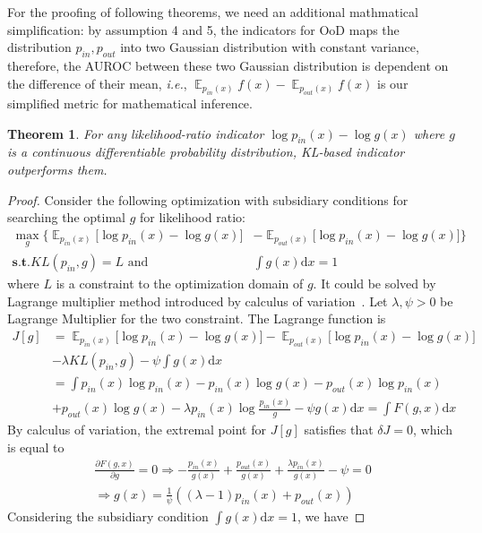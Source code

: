 \documentclass[a3paper]{article}
\newtheorem{theorem}{Theorem}
\newtheorem*{proof}{\it{Proof.}\rm}
\newcommand{\IE}{\textit{i.e.}, }
\newcommand{\dd}{\mathrm{d}}
\newcommand{\E}{\operatorname{\mathbb{E}}}
\newcommand{\pin}{p_{in}}
\newcommand{\pout}{p_{out}}
\begin{document}
For the proofing of following theorems, we need an additional mathmatical simplification: by assumption 4 and 5, the indicators for OoD maps the distribution $\pin, \pout$ into two Gaussian distribution with constant variance, therefore, the AUROC between these two Gaussian distribution is dependent on the difference of their mean, \IE $\E_{\pin(x)} f(x) - \E_{\pout(x)} f(x)$ is our simplified metric for mathematical inference. 

\begin{theorem}\label{thm4}
For any likelihood-ratio indicator $\log \pin(x) - \log g(x)$ where $g$ is a continuous differentiable probability distribution, KL-based indicator outperforms them.
\end{theorem}
\begin{proof}\rm
	Consider the following optimization with subsidiary conditions for searching the optimal $g$ for likelihood ratio:
	\begin{align*}
	\max_g \Big\{\E_{\pin(x)} \big[\log \pin(x) - \log g(x)\big] &- \E_{\pout(x)} \big[\log \pin(x) - \log g(x)\big]\Big\} \\
	\textbf{s.t.} KL(\pin, g) = L \text{ and } &\int g(x) \dd x = 1 
	\end{align*}
	where $L$ is a constraint to the optimization domain of $g$. It could be solved by Lagrange multiplier method introduced by calculus of variation~\cite{gelfand2000calculus}. 
	Let $\lambda, \psi > 0$ be Lagrange Multiplier for the two constraint. The Lagrange function is 
	\begin{align*}
		J[g] &= \E_{\pin(x)} \big[\log \pin(x) - \log g(x)\big] - \E_{\pout(x)} \big[\log \pin(x) - \log g(x)\big] \\
		&-\lambda KL(\pin, g) - \psi \int g(x) \dd x \\
		&= \int \pin(x) \log \pin(x) - \pin(x) \log g(x) - \pout(x) \log \pin(x) \\ 
		&+ \pout(x) \log g(x) - \lambda \pin(x) \log \frac{\pin(x)}{g} - \psi g(x) \dd x = \int F(g, x) \dd x
	\end{align*}
	By calculus of variation, the extremal point for $J[g]$ satisfies that $\delta J = 0$, which is equal to
	\begin{align*}
		\frac{\partial F(g, x)}{\partial g} = 0 \Rightarrow -\frac{\pin(x)}{g(x)} + \frac{\pout(x)}{g(x)} + \frac{\lambda \pin(x)}{g(x)} - \psi = 0 \\
		\Rightarrow g(x) = \frac{1}{\psi} ((\lambda - 1)\pin(x) + \pout(x))
	\end{align*}
	Considering the subsidiary condition $\int g(x) \dd x = 1$, we have

\end{proof}
\end{document}
